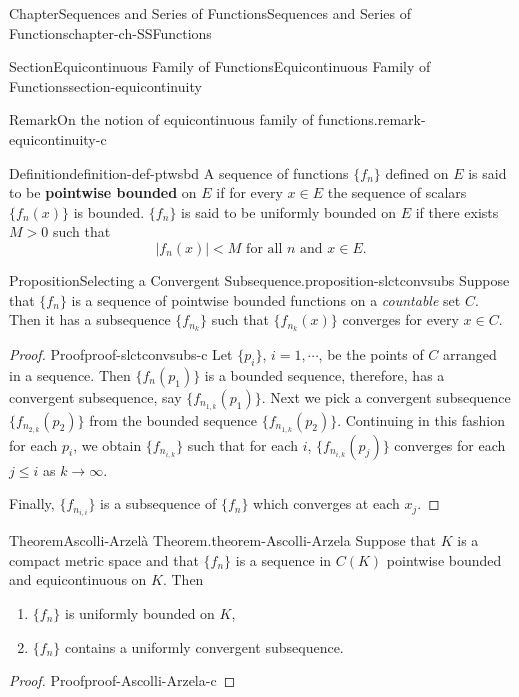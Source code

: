 \documentclass[oneside,10pt,]{book}
\newcommand{\terminology}[1]{\textbf{#1}}
\numberwithin{equation}{section}
\begin{document}
\begin{chapterptx}{Chapter}{Sequences and Series of Functions}{}{Sequences and Series of Functions}{}{}{chapter-ch-SSFunctions}
\begin{sectionptx}{Section}{Equicontinuous Family of Functions}{}{Equicontinuous Family of Functions}{}{}{section-equicontinuity}
\begin{remark}{Remark}{On the notion of equicontinuous family of functions.}{remark-equicontinuity-c}
\end{remark}
\begin{definition}{Definition}{}{definition-def-ptwsbd}%
A sequence of functions \(\{f_{n}\} \) defined on \(E\) is said to be \terminology{pointwise bounded} on \(E\) if for every \(x\in E\)  the sequence of scalars \(\{f_{n}(x)\} \) is bounded. \(\{f_{n}\} \)  is said to be uniformly bounded on \(E\) if there exists \(M > 0\) such that%
\begin{equation*}
|f_{n}(x)| < M \text{ for all } n \text{ and } x\in E.
\end{equation*}
\end{definition}
\begin{proposition}{Proposition}{Selecting a Convergent Subsequence.}{}{proposition-slctconvsubs}%
Suppose that  \(\{f_{n}\} \) is a sequence of pointwise bounded functions on a \emph{countable} set \(C\). Then it has a subsequence \(\{f_{n_{k}}\}\) such that \(\{f_{n_{k}}(x)\}\) converges for every \(x\in C\).\end{proposition}
\begin{proof}{Proof}{}{proof-slctconvsubs-c}
Let \(\{p_{i}\}\), \(i=1,\cdots\), be the points of \(C\) arranged in a sequence. Then \(\{f_{n}(p_{1})\} \) is a bounded sequence, therefore, has a convergent subsequence, say \(\{f_{n_{1,k}}(p_{1})\} \). Next we pick a convergent subsequence \(\{f_{n_{2, k}}(p_{2})\} \) from the bounded sequence \(\{f_{n_{1,k}}(p_{2})\} \). Continuing in this fashion for each \(p_{i}\), we obtain \(\{f_{n_{i, k}}\}\) such that for each \(i\), \(\{f_{n_{i, k}}(p_{j})\}\) converges for each \(j\le i\) as \(k\to \infty\).%
\par
Finally, \(\{f_{n_{i, i}}\}\) is a subsequence of \(\{f_{n}\} \) which converges at each \(x_{j}\).%
\end{proof}
\begin{theorem}{Theorem}{Ascolli-Arzelà Theorem.}{}{theorem-Ascolli-Arzela}%
Suppose that \(K\) is a compact metric space and that \(\{f_{n}\} \) is a sequence in \(C(K)\) pointwise bounded and equicontinuous on \(K\).  Then %
\begin{enumerate}[label=(\alph*)]
\item{}\(\{f_{n}\} \) is uniformly bounded on \(K\),%
\item{}\(\{f_{n}\} \) contains a uniformly convergent subsequence.%
\end{enumerate}
\end{theorem}
\begin{proof}{Proof}{}{proof-Ascolli-Arzela-c}

\end{proof}
\end{sectionptx}
\end{chapterptx}
\end{document}
